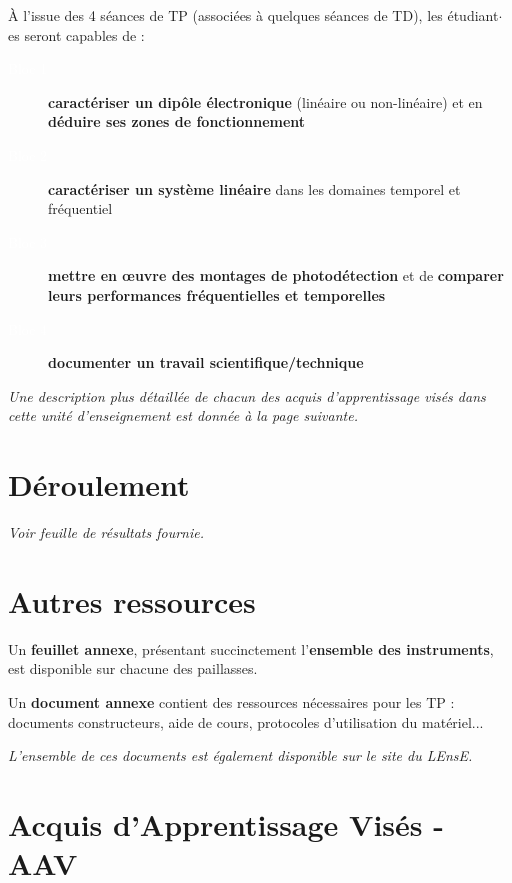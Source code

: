 \documentclass[a4paper,11pt,twoside]{book} %
\begin{document}
{\large À l'issue des 4 séances de TP (associées à quelques séances de TD), les étudiant$\cdot$es seront capables de :

\begin{description}
	\item[\colorbox{violet_iogs}{\textcolor{white}{Bloc 1}}] \textbf{caractériser un dipôle électronique}
(linéaire ou non-linéaire) et en \textbf{déduire ses zones de fonctionnement}
	\item[\colorbox{violet_iogs}{\textcolor{white}{Bloc 2}}] \textbf{caractériser un système linéaire} dans les domaines temporel et fréquentiel
	\item[\colorbox{violet_iogs}{\textcolor{white}{Bloc 3}}] \textbf{mettre en \oe{}uvre des montages de photodétection} et de \textbf{comparer leurs performances fréquentielles et temporelles}
	\item[\colorbox{violet_iogs}{\textcolor{white}{Bloc 4}}] \textbf{documenter un travail scientifique/technique }
\end{description}

\textit{Une description plus détaillée de chacun des acquis d'apprentissage visés dans cette unité d'enseignement est donnée à la page suivante.}

\section{Déroulement}

\textit{Voir feuille de résultats fournie.}

\section{Autres ressources}

Un \textbf{feuillet annexe}, présentant succinctement l'\textbf{ensemble des instruments}, est disponible sur chacune des paillasses.

Un \textbf{document annexe} contient des ressources nécessaires pour les TP : documents constructeurs, aide de cours, protocoles d'utilisation du matériel...

\medskip

\textit{L'ensemble de ces documents est également disponible sur le site du LEnsE.}

\newpage

\section{Acquis d'Apprentissage Visés - AAV}

}
\end{document}
